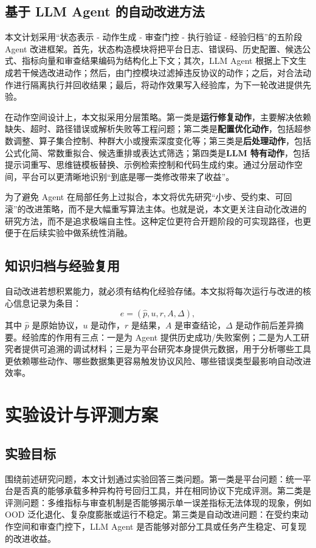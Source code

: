 \documentclass[UTF8,12pt]{ctexart}
\begin{document}
\subsection{基于 LLM Agent 的自动改进方法}

本文计划采用“状态表示 - 动作生成 - 审查门控 - 执行验证 - 经验归档”的五阶段 Agent 改进框架。首先，状态构造模块将把平台日志、错误码、历史配置、候选公式、指标向量和审查结果编码为结构化上下文；其次，LLM Agent 根据上下文生成若干候选改进动作；然后，由门控模块过滤掉违反协议的动作；之后，对合法动作进行隔离执行并回收结果；最后，将动作效果写入经验库，为下一轮改进提供先验。

在动作空间设计上，本文拟采用分层策略。第一类是\textbf{运行修复动作}，主要解决依赖缺失、超时、路径错误或解析失败等工程问题；第二类是\textbf{配置优化动作}，包括超参数调整、算子集合控制、种群大小或搜索深度变化等；第三类是\textbf{后处理动作}，包括公式化简、常数重拟合、候选重排或表达式筛选；第四类是\textbf{LLM 特有动作}，包括提示词重写、思维链模板替换、示例检索控制和代码生成约束。通过分层动作空间，平台可以更清晰地识别“到底是哪一类修改带来了收益”。

为了避免 Agent 在局部任务上过拟合，本文将优先研究“小步、受约束、可回滚”的改进策略，而不是大幅重写算法主体。也就是说，本文更关注自动化改进的研究方法，而不是追求极端自主性。这种定位更符合开题阶段的可实现路径，也更便于在后续实验中做系统性消融。

\subsection{知识归档与经验复用}

自动改进若想积累能力，就必须有结构化经验存储。本文拟将每次运行与改进的核心信息记录为条目：
\[
e = (\hat{p}, u, r, A, \Delta),
\]
其中 $\hat{p}$ 是原始协议，$u$ 是动作，$r$ 是结果，$A$ 是审查结论，$\Delta$ 是动作前后差异摘要。经验库的作用有三点：一是为 Agent 提供历史成功/失败案例；二是为人工研究者提供可追溯的调试材料；三是为平台研究本身提供元数据，用于分析哪些工具更依赖哪些动作、哪些数据集更容易触发协议风险、哪些错误类型最影响自动改进效率。

\section{实验设计与评测方案}

\subsection{实验目标}

围绕前述研究问题，本文计划通过实验回答三类问题。第一类是平台问题：统一平台是否真的能够承载多种异构符号回归工具，并在相同协议下完成评测。第二类是评测问题：多维指标与审查机制是否能够揭示单一误差指标无法体现的现象，例如 OOD 泛化退化、复杂度膨胀或运行不稳定。第三类是自动改进问题：在受约束动作空间和审查门控下，LLM Agent 是否能够对部分工具或任务产生稳定、可复现的改进收益。
\end{document}
